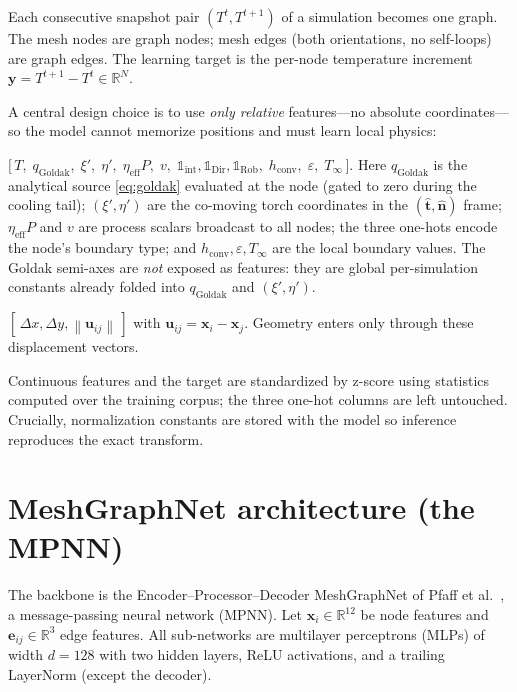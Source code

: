 \documentclass[11pt]{article}
\newcommand{\Tinf}{T_{\infty}}
\newcommand{\Rset}{\mathbb{R}}
\newcommand{\norm}[1]{\left\lVert#1\right\rVert}
\theoremstyle{definition}
\begin{document}
Each consecutive snapshot pair $(T^t,T^{t+1})$ of a simulation becomes one graph. The
mesh nodes are graph nodes; mesh edges (both orientations, no self-loops) are graph
edges. The learning target is the per-node temperature increment
$\bm y = T^{t+1}-T^{t}\in\Rset^{N}$.

A central design choice is to use \emph{only relative} features---no absolute
coordinates---so the model cannot memorize positions and must learn local physics:

\begin{description}[leftmargin=1.2em,style=nextline]
\item[Node features ($12$-d).]
$\big[\,T,\; q_{\mathrm{Goldak}},\; \xi',\;\eta',\; \eta_{\mathrm{eff}}P,\; v,\;
\mathbb{1}_{\mathrm{int}},\mathbb{1}_{\mathrm{Dir}},\mathbb{1}_{\mathrm{Rob}},\;
h_{\mathrm{conv}},\; \varepsilon,\; \Tinf\,\big]$.
Here $q_{\mathrm{Goldak}}$ is the analytical source \cref{eq:goldak} evaluated at the
node (gated to zero during the cooling tail); $(\xi',\eta')$ are the co-moving torch
coordinates in the $(\hat{\bm t},\hat{\bm n})$ frame; $\eta_{\mathrm{eff}}P$ and $v$ are
process scalars broadcast to all nodes; the three one-hots encode the node's
boundary type; and $h_{\mathrm{conv}},\varepsilon,\Tinf$ are the local boundary values.
The Goldak semi-axes are \emph{not} exposed as features: they are global per-simulation
constants already folded into $q_{\mathrm{Goldak}}$ and $(\xi',\eta')$.
\item[Edge features ($3$-d).] $[\,\Delta x,\Delta y,\norm{\bm u_{ij}}\,]$ with
$\bm u_{ij}=\bm x_i-\bm x_j$. Geometry enters only through these displacement vectors.
\end{description}

Continuous features and the target are standardized by z-score using statistics
computed over the training corpus; the three one-hot columns are left untouched.
Crucially, normalization constants are stored with the model so inference reproduces
the exact transform.

\section{MeshGraphNet architecture (the MPNN)}
\label{sec:mpnn}

The backbone is the Encoder--Processor--Decoder MeshGraphNet of
Pfaff et al.~\cite{pfaff2021learning}, a message-passing neural network (MPNN). Let
$\bm x_i\in\Rset^{12}$ be node features and $\bm e_{ij}\in\Rset^{3}$ edge features. All
sub-networks are multilayer perceptrons (MLPs) of width $d=128$ with two hidden layers,
ReLU activations, and a trailing LayerNorm (except the decoder).
\end{document}
